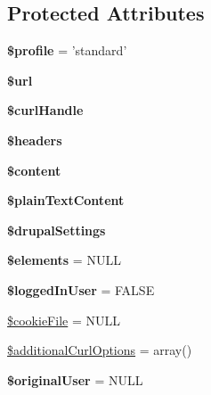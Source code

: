 \subsection*{Protected Attributes}
\begin{DoxyCompactItemize}
\item 
\hypertarget{classDrupalWebTestCase_a3976ed874796037d5cdda6f371d2615f}{
{\bfseries \$profile} = 'standard'}
\label{classDrupalWebTestCase_a3976ed874796037d5cdda6f371d2615f}

\item 
\hypertarget{classDrupalWebTestCase_a4602319c57e56cfd4de80d3d58d99c33}{
{\bfseries \$url}}
\label{classDrupalWebTestCase_a4602319c57e56cfd4de80d3d58d99c33}

\item 
\hypertarget{classDrupalWebTestCase_adcb3393cbfce2d08945b059fa0982b92}{
{\bfseries \$curlHandle}}
\label{classDrupalWebTestCase_adcb3393cbfce2d08945b059fa0982b92}

\item 
\hypertarget{classDrupalWebTestCase_a1a571a6bfdae7765a8e0d4431938d113}{
{\bfseries \$headers}}
\label{classDrupalWebTestCase_a1a571a6bfdae7765a8e0d4431938d113}

\item 
\hypertarget{classDrupalWebTestCase_a2c8714ff957ba172102f9bfe70af25ee}{
{\bfseries \$content}}
\label{classDrupalWebTestCase_a2c8714ff957ba172102f9bfe70af25ee}

\item 
\hypertarget{classDrupalWebTestCase_a30f2d25c0f3771ee04989bbf18831255}{
{\bfseries \$plainTextContent}}
\label{classDrupalWebTestCase_a30f2d25c0f3771ee04989bbf18831255}

\item 
\hypertarget{classDrupalWebTestCase_a01d833c07e653256040b09801e5ec4c2}{
{\bfseries \$drupalSettings}}
\label{classDrupalWebTestCase_a01d833c07e653256040b09801e5ec4c2}

\item 
\hypertarget{classDrupalWebTestCase_a27ca1fb44586c85ca1998ca9651e8050}{
{\bfseries \$elements} = NULL}
\label{classDrupalWebTestCase_a27ca1fb44586c85ca1998ca9651e8050}

\item 
\hypertarget{classDrupalWebTestCase_ab6dfacb280e215891cbc5fc4f1df5813}{
{\bfseries \$loggedInUser} = FALSE}
\label{classDrupalWebTestCase_ab6dfacb280e215891cbc5fc4f1df5813}

\item 
\hyperlink{classDrupalWebTestCase_abee07354ff94d9b036c7b2e1b1855176}{\$cookieFile} = NULL
\item 
\hyperlink{classDrupalWebTestCase_a8e4e1c5a9b63d403d10ad2f6a2f06aaa}{\$additionalCurlOptions} = array()
\item 
\hypertarget{classDrupalWebTestCase_a110c8164d28753a6cee415f8e199c63f}{
{\bfseries \$originalUser} = NULL}
\label{classDrupalWebTestCase_a110c8164d28753a6cee415f8e199c63f}


\end{DoxyCompactItemize}
